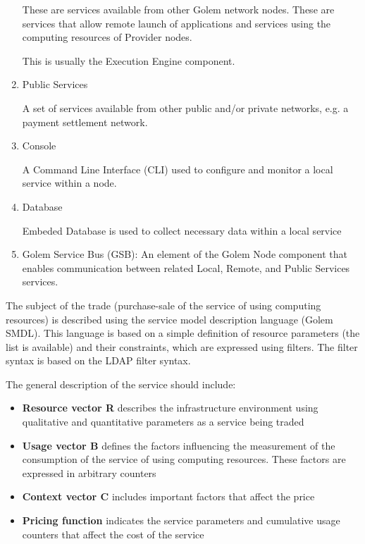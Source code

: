 \begin{enumerate}
These are services available from other Golem network nodes. These are services that allow remote launch of
applications and services using the computing resources of Provider nodes.

This is usually the Execution Engine component.

\item Public Services

A set of services available from other public and/or private networks, e.g. a payment settlement network.

\item Console

A Command Line Interface (CLI) used to configure and monitor a local service within a node.

\item Database

Embeded Database is used to collect necessary data within a local service

\item Golem Service Bus (GSB): An element of the Golem Node component that enables communication between related Local, Remote, and Public Services services.

\end{enumerate}

The subject of the trade (purchase-sale of the service of using computing resources)
is described using the service model description language (Golem SMDL).
This language is based on a simple definition of resource parameters (the list is available) and their constraints, which are expressed using filters.
The filter syntax is based on the LDAP filter syntax.

The general description of the service should include:

\begin{itemize}
\item {\bf Resource vector R} describes the infrastructure environment using qualitative and quantitative parameters as a service being traded
\item {\bf Usage vector B} defines the factors influencing the measurement of the consumption of the service of using computing resources. These factors are expressed in arbitrary counters
\item {\bf Context vector C} includes important factors that affect the price
\item {\bf Pricing function} indicates the service parameters and cumulative usage counters that affect the cost of the service
\end{itemize}

